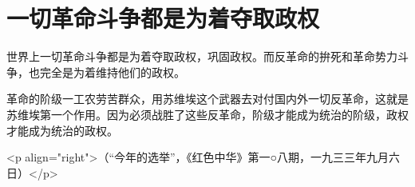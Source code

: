\section[一切革命斗争都是为着夺取政权（一九三三年九月六日）]{一切革命斗争都是为着夺取政权}


世界上一切革命斗争都是为着夺取政权，巩固政权。而反革命的拚死和革命势力斗争，也完全是为着维持他们的政权。

革命的阶级一工农劳苦群众，用苏维埃这个武器去对付国内外一切反革命，这就是苏维埃第一个作用。因为必须战胜了这些反革命，阶级才能成为统治的阶级，政权才能成为统治的政权。

<p align="right">（“今年的选举”，《红色中华》第一○八期，一九三三年九月六日）</p>

